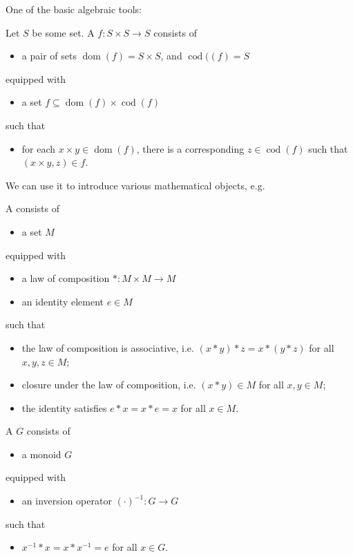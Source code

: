 One of the basic algebraic tools:
\begin{defn}%
Let $S$ be some set. A 
$f:S\times{S}\to{S}$ consists of
\begin{itemize}
\item a pair of sets $\operatorname{dom}(f)=S\times{S}$, and $\operatorname{cod}((f)=S$
\end{itemize}
equipped with
\begin{itemize}
\item a set $f\subseteq\operatorname{dom}(f)\times\operatorname{cod}(f)$
\end{itemize}
such that
\begin{itemize}
\item for each $x\times{y}\in\operatorname{dom}(f)$, there is a corresponding
  $z\in{\operatorname{cod}(f)}$ such that $(x\times{y},z)\in{f}$.
\end{itemize}
\end{defn}
We can use it to introduce various mathematical objects, e.g.
\begin{defn}%
A  consists of
\begin{itemize}
\item a set $M$
\end{itemize}
equipped with
\begin{itemize}
\item a law of composition $*:M\times{M}\to{}M$
\item an identity element $e\in{M}$
\end{itemize}
such that
\begin{itemize}
\item the law of composition is associative,
  i.e. $(x*y)*z=x*(y*z)$ for all $x,y,z\in{M}$;
\item closure under the law of composition, i.e. $(x*y)\in{M}$
  for all $x,y\in{M}$;
\item the identity satisfies $e*x=x*e=x$ for all $x\in{M}$.
\end{itemize}
\end{defn}

\begin{defn}%
A  $G$ consists of
\begin{itemize}
\item a monoid $G$
\end{itemize}
equipped with
\begin{itemize}
\item an inversion operator $(\cdot{})^{-1}:G\to{G}$
\end{itemize}
such that
\begin{itemize}
\item $x^{-1}*x=x*x^{-1}=e$ for all $x\in{G}$.
\end{itemize}
\end{defn}
